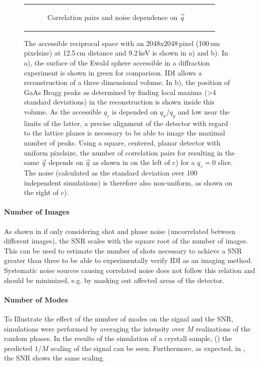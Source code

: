 \begin{figure}
\begin{tabular}[t]{cc}
\begin{subfigure}{0.52\textwidth}
	\caption{Correlation pairs and noise dependence on $\vec{q}$ } 
\end{subfigure}\\
	\end{tabular}
	\caption[Accessible reciprocal space]{The accessible reciprocal space with an 2048x2048\,pixel (100\,um pixelsize) at 12.5\,cm distance and 9.2\,keV is shown in a) and b). In a), the surface of the Ewald sphere accessible in a diffraction experiment is shown in green for comparison. IDI allows a reconstruction of a three dimensional volume. In b), the position of GaAs Bragg peaks as determined by finding local maxima (>4 standard deviations) in the reconstruction is shown inside this volume. As the accessible $q_z$ is depended on $q_x$/$q_y$ and low near the limits of the latter, a precise alignment of the detector with regard to the lattice planes is necessary to be able to image the maximal number of peaks. Using a square, centered, planar detector with uniform pixelsize, the number of correlation pairs for resulting in the same $\vec{q}$ depends on $\vec{q}$ as shown in on the left of c) for a $q_z=0$ slice. The noise (calculated as the standard deviation over 100 independent simulations) is therefore also non-uniform, as shown on the right of c).}
	
\end{figure}



\paragraph{Number of Images}
As shown in  if only considering shot and phase noise (uncorrelated between different  images), the SNR scales with the square root of the number of images.  This can be used to estimate the number of shots necessary to achieve a SNR greater than three to be able to experimentally verify IDI as an imaging method. Systematic noise sources causing correlated noise does not follow this relation and should be minimized, e.g. by masking out affected areas of the detector.
 
\paragraph{Number of Modes}
To Illustrate the effect of the number of modes on the signal and the SNR, simulations were performed by averaging the intensity over $M$ realizations of the random phases.  In the results of the simulation of a crystall sample, () the predicted $1/M$ scaling of the signal can be seen. Furthermore, as expected, in , the SNR shows the same scaling.

